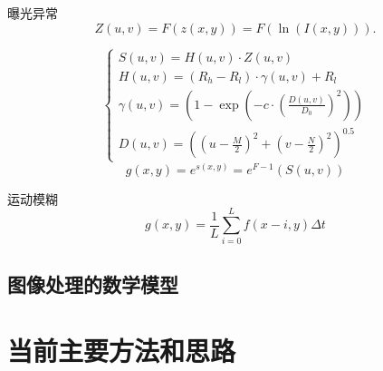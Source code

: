 \documentclass{beamer}
\begin{document}
\begin{frame}
  \begin{block}{曝光异常}
  \begin{equation}
    \label{eq:02}
Z(u, v)=F(z(x, y))=F(\ln (I(x, y))).
  \end{equation}

  \begin{equation}
    \label{eq:03}
\left\{\begin{array}{l}
S(u, v)=H(u, v) \cdot Z(u, v) \\
H(u, v)=\left(R_{h}-R_{l}\right) \cdot \gamma(u, v)+R_{l} \\
\gamma(u, v)=\left(1-\exp \left(-c \cdot\left(\frac{D(u, v)}{D_{0}}\right)^{2}\right)\right) \\
D(u, v)=\left(\left(u-\frac{M}{2}\right)^{2}+\left(v-\frac{N}{2}\right)^{2}\right)^{0.5}
\end{array}\right.
  \end{equation}
  \begin{equation}
    \label{eq:04}
g(x, y)=e^{s(x, y)}=e^{F-1}(S(u, v))
  \end{equation}
  \end{block}
\end{frame}
\begin{frame}
  \begin{block}{运动模糊}
  \begin{equation}
    \label{eq:05}
g(x, y)=\frac{1}{L} \sum_{i=0}^{L} f(x-i, y) \Delta t
  \end{equation}
  \end{block}
\end{frame}
\subsection{图像处理的数学模型}
\section{当前主要方法和思路}
\end{document}
